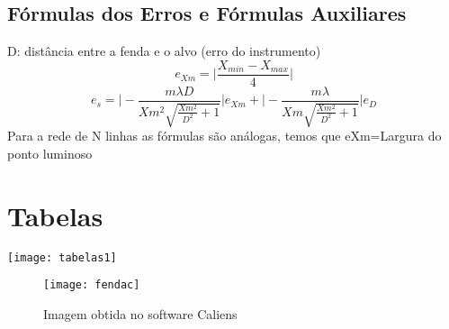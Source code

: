 \documentclass[10pt,a4paper]{article}
\begin{document}
{\subsection*{Fórmulas dos Erros e Fórmulas Auxiliares}
D: distância entre a fenda e o alvo (erro do instrumento)
\begin{equation}
e_{Xm}=\bigg\vert\frac{X_{min}-X_{max}}{4}\bigg\vert
\end{equation}
\begin{equation}
e_s=\Bigg\vert-\frac{m \lambda D}{Xm^{2}\sqrt{\frac{Xm^2}{D^2}+1}}\Bigg\vert e_{Xm}+\Bigg\vert-\frac{m \lambda}{Xm\sqrt{\frac{Xm^2}{D^2}+1}}\Bigg\vert e_{D}
\end{equation}
Para a rede de N linhas as fórmulas são análogas, temos  que 
eXm=Largura do ponto luminoso
\section*{Tabelas}
\begin{center}
\texttt{[image: tabelas1]}
\end{center}
\newpage
\begin{figure}
\begin{center}
\texttt{[image: fendac]}
\caption{Imagem obtida no software Caliens}
\end{center}
\end{figure}
}
\end{document}

